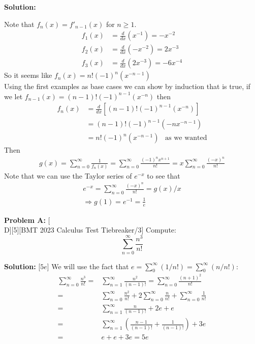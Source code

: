 \documentclass[12pt]{article}
\newcounter{problem}
\newenvironment{problem}[1]{%
    \stepcounter{problem}
    \noindent\textbf{Problem A\theproblem:} #1
    \\[1em]
}{}
\newenvironment{solution}{%
    \vspace{1em}
    \noindent\textbf{Solution:} 
}{}
\begin{document}
\begin{solution}
      Note that \( f_n(x) = f'_{n-1}(x) \) for \( n \geq 1 \).
      \begin{align*}
         f_1(x) &= \frac{d}{dx} (x^{-1}) = -x^{-2} \\
         f_2(x) &= \frac{d}{dx} (-x^{-2}) = 2x^{-3} \\
         f_3(x) &= \frac{d}{dx} (2x^{-3}) = -6x^{-4}
      \end{align*}
      So it seems like \( f_n(x) = n!(-1)^n(x^{-n-1}) \) \\
      Using the first examples as base cases we can show by induction that is true, if we let \( f_{n-1}(x) = (n-1)!(-1)^{n-1}(x^{-n}) \) then
      \begin{align*}
         f_n(x) &= \frac{d}{dx} \left[ (n-1)!(-1)^{n-1}(x^{-n}) \right] \\
         &= (n-1)!(-1)^{n-1}(-nx^{-n-1}) \\
         &= n!(-1)^n(x^{-n-1}) \hspace{10pt} \text{as we wanted}
      \end{align*}
      Then 
      \begin{align*}
         g(x) = \sum_{n=0}^{\infty} \frac{1}{f_n(x)} = \sum_{n=0}^{\infty} 
         \frac{ (-1)^nx^{n+1}} {n!} =  x\sum_{n=0}^{\infty} 
         \frac{ (-x)^n }{n!}
      \end{align*}
      Note that we can use the Taylor series of \(e^{-x}\) to see that
      \begin{align*}
         e^{-x} = \sum_{n=0}^{\infty} \frac{ (-x)^n }{n!} = g(x)/x \\
         \Rightarrow g(1) = e^{-1} = \frac{1}{e}
      \end{align*}
\end{solution}

\vskip 1cm

\begin{problem}[D][5][BMT 2023 Calculus Test Tiebreaker/3]
    Compute:
    \[ \sum_{n=0}^{\infty} \frac{n^3}{n!} \]
\end{problem}

\begin{solution}[$5e$]
   We will use the fact that $e = \sum_0^\infty (1/n!) = \sum_0^\infty (n/n!)$:
    \begin{align*}
        \sum_{n=0}^{\infty} \frac{n^3}{n!} =& \sum_{n=1}^{\infty} \frac{n^2}{(n-1)!}
        = \sum_{n=0}^{\infty} \frac{(n+1)^2}{n!} \\
        =& \sum_{n=0}^{\infty} \frac{n^2}{n!} + 2\sum_{n=0}^{\infty} \frac{n}{n!} +
        \sum_{n=0}^{\infty} \frac{1}{n!} \\
        =& \sum_{n=1}^{\infty} \frac{n}{(n-1)!} +  2e + e \\
        =& \sum_{n=1}^{\infty} \left( \frac{n-1}{(n-1)!} + \frac{1}{(n-1)!} \right) + 3e \\
        =& e+e+3e = \boxed{5e}
    \end{align*}
\end{solution}
\end{document}
